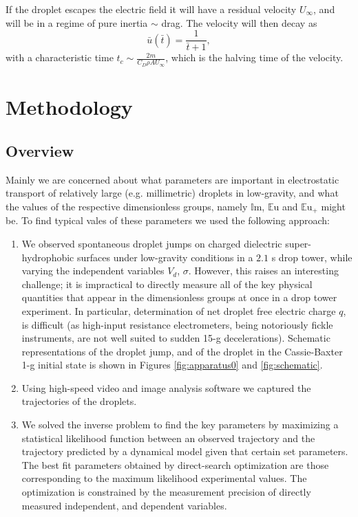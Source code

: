 \documentclass[12pt,a4paper,oneside]{book}
\begin{document}
If the droplet escapes the electric field it will have a residual velocity $U_{\infty}$, and will be in a regime of pure inertia $\sim$ drag. The velocity will then decay as
\[
\bar{u}(\bar{t}) = \frac{1}{\bar{t} + 1},
\]
with a characteristic time $t_c \sim \frac{2 m}{C_D \rho A U_{\infty}}$, which is the halving time of the velocity. 

\chapter{Methodology}
\section{Overview}
Mainly we are concerned about what parameters are important in electrostatic transport of relatively large (e.g. millimetric) droplets in low-gravity, and what the values of the respective dimensionless groups, namely $\mathbb{I}\mbox{m}$, $\mathbb{E}\mbox{u}$ and ${\mathbb{E}\mbox{u}}_+$ might be. To find typical vales of these parameters we used the following approach:
\begin{enumerate}
\item We observed spontaneous droplet jumps on charged dielectric super-hydrophobic surfaces under low-gravity conditions in a $2.1$ s drop tower, while varying the independent variables $V_d$, $\sigma$. However, this raises an interesting challenge; it is impractical to directly measure all of the key physical quantities that appear in the dimensionless groups at once in a drop tower experiment. In particular, determination of net droplet free electric charge $q$, is difficult (as high-input resistance electrometers, being notoriously fickle instruments, are not well suited to sudden 15-g decelerations). Schematic representations of the droplet jump, and of the droplet in the Cassie-Baxter 1-g initial state is shown in Figures \ref{fig:apparatus0} and \ref{fig:schematic}.
\item Using high-speed video and image analysis software we captured the trajectories of the droplets. 
\item We solved the inverse problem to find the key parameters by maximizing a statistical likelihood function between an observed trajectory and the trajectory predicted by a dynamical model given that certain set parameters. The best fit parameters obtained by direct-search optimization are those corresponding to the maximum likelihood experimental values. The optimization is constrained by the measurement precision of directly measured independent, and dependent variables.
\end{enumerate}
\end{document}
